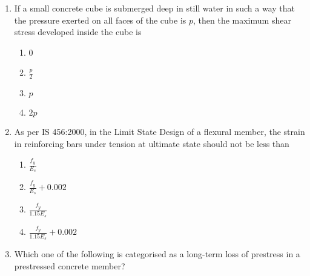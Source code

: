 \documentclass[journal]{IEEEtran}
\begin{document}
\begin{enumerate}
I The slope of the bending moment diagram is equal to the shear force.\\
II The slope of the shear force diagram is equal to the load intensity.\\
III The slope of the curvature is equal to the flexural rotation.\\
IV The second derivative of the deflection is equal to the curvature.\\
The only FALSE statement is
   \begin{multicols}{4}
			\begin{enumerate}
   \item I
\item II
\item III
\item IV
\end{enumerate}
		\end{multicols}
  \item If a small concrete cube is submerged deep in still water in such a way that the pressure exerted on all faces of the cube is $p$, then the maximum shear stress developed inside the cube is
   \begin{multicols}{1}
			\begin{enumerate}
   \item  0
\item$\frac{p}{2}$
\item $p$
\item$2 p$
\end{enumerate}
		\end{multicols}
  \item As per IS 456:2000, in the Limit State Design of a flexural member, the strain in reinforcing bars under tension at ultimate state should not be less than
  \begin{multicols}{4}
			\begin{enumerate}
\item $\frac{f_{y}}{E_{s}}$
\item $\frac{f_{y}}{E_{s}}+0.002$
\item $\frac{f_{y}}{1.15 E_{s}}$
\item $\frac{f_{y}}{1.15 E_{s}}+0.002$
\end{enumerate}
		\end{multicols}
  \item Which one of the following is categorised as a long-term loss of prestress in a prestressed concrete member?
   \begin{multicols}{1}
			\begin{enumerate}

\end{enumerate}
\end{multicols}
\end{enumerate}
\end{document}
